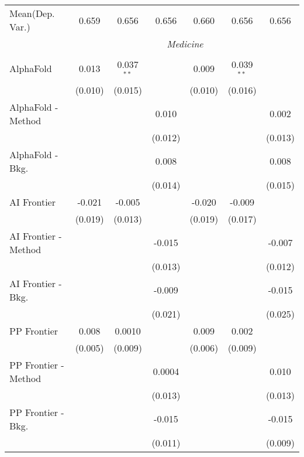 \begin{tabular}{lcccccc}
Mean(Dep. Var.) & 0.659 & 0.656 & 0.656 & 0.660 & 0.656 & 0.656 \\
 & \multicolumn{6}{c}{\textit{Medicine}} \\ \\
   AlphaFold            & 0.013   & 0.037$^{**}$ &         & 0.009   & 0.039$^{**}$ &   \\   
                        & (0.010) & (0.015)      &         & (0.010) & (0.016)      &   \\   
   AlphaFold - Method   &         &              & 0.010   &         &              & 0.002\\   
                        &         &              & (0.012) &         &              & (0.013)\\   
   AlphaFold - Bkg.     &         &              & 0.008   &         &              & 0.008\\   
                        &         &              & (0.014) &         &              & (0.015)\\   
   AI Frontier          & -0.021  & -0.005       &         & -0.020  & -0.009       &   \\   
                        & (0.019) & (0.013)      &         & (0.019) & (0.017)      &   \\   
   AI Frontier - Method &         &              & -0.015  &         &              & -0.007\\   
                        &         &              & (0.013) &         &              & (0.012)\\   
   AI Frontier - Bkg.   &         &              & -0.009  &         &              & -0.015\\   
                        &         &              & (0.021) &         &              & (0.025)\\   
   PP Frontier          & 0.008   & 0.0010       &         & 0.009   & 0.002        &   \\   
                        & (0.005) & (0.009)      &         & (0.006) & (0.009)      &   \\   
   PP Frontier - Method &         &              & 0.0004  &         &              & 0.010\\   
                        &         &              & (0.013) &         &              & (0.013)\\   
   PP Frontier - Bkg.   &         &              & -0.015  &         &              & -0.015\\   
                        &         &              & (0.011) &         &              & (0.009)\\   

\end{tabular}
